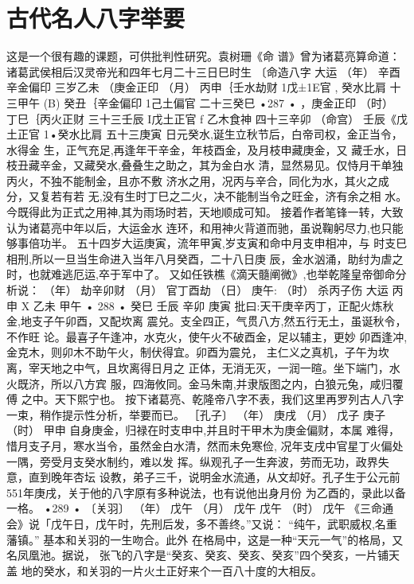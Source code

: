\section{古代名人八字举要}
这是一个很有趣的课题，可供批判性研究。袁树珊《命
谱》曾为诸葛亮算命道：
诸葛武侯相后汉灵帝光和四年七月二十三日巳时生
〔命造八字 大运
（年） 辛酉辛金偏印 三岁乙未
（庚金正印
（月） 丙申｛壬水劫财
1戊±1E官
,
癸水比肩
十三甲午
(B) 癸丑｛辛金偏印
1己土偏官
二十三癸巳
•287 •
，庚金正印
（时） 丁巳｛丙火正财 三十三壬辰 I戊土正官
f
乙木食神 四十三辛卯
（命宫） 壬辰《戊土正官
1•癸水比肩 五十三庚寅
日元癸水,诞生立秋节后，白帝司权，金正当令，水得金
生，正气充足,再逢年干辛金，年枝酉金，及月枝申藏庚金，又
藏壬水，日枝丑藏辛金，又藏癸水,叠叠生之助之，其为金白水
清，显然易见。仅恃月干单独丙火，不独不能制金，且亦不敷
济水之用，况丙与辛合，同化为水，其火之成分，又复若有若
无,没有生时丁巳之二火，决不能制当令之旺金，济有余之相
水。今既得此为正式之用神,其为雨场时若，天地顺成可知。
接着作者笔锋一转，大致认为诸葛亮中年以后，大运金水
连环，和用神火背道而驰，虽说鞠躬尽力,也只能够事倍功半。
五十四岁大运庚寅，流年甲寅,岁支寅和命中月支申相冲，与
时支巳相刑,所以一旦当生命进入当年八月癸酉，二十八日庚
辰，金水汹涌，助纣为虐之时，也就难逃厄运,卒于军中了。
又如任铁樵《滴天髓阐微》,也举乾隆皇帝御命分析说：
（年） 劫辛卯财
（月） 官丁酉劫
（日） 庚午:
（时） 杀丙子伤
大运 丙申 X
乙未
甲午
• 288 •
癸巳
壬辰
辛卯
庚寅
批曰:天干庚辛丙丁，正配火炼秋金,地支子午卯酉，又配坎离
震兑。支全四正，气贯八方,然五行无土，虽诞秋令，不作旺
论。最喜子午逢冲，水克火，使午火不破酉金，足以辅主，更妙
卯酉逢冲,金克木，则卯木不助午火，制伏得宜。卯酉为震兑，
主仁义之真机，子午为坎离，宰天地之中气，且坎离得日月之
正体，无消无灭，一润一暄。坐下端门，水火既济，所以八方宾
服，四海攸同。金马朱南,并隶版图之内，白狼元兔，咸归覆傅
之中。天下熙宁也。
按下诸葛亮、乾隆帝八字不表，我们这里再罗列古人八字
一束，稍作提示性分析，举要而已。
［孔子〕
（年） 庚戌
（月） 戊子
庚子
（时） 甲申
自身庚金，归禄在时支申中,并且时干甲木为庚金偏财，本属
难得，惜月支子月，寒水当令，虽然金白水清，然而未免寒俭,
况年支戌中官星丁火偏处一隅，旁受月支癸水制约，难以发
挥。纵观孔子一生奔波，劳而无功，政界失意，直到晚年杏坛
设教，弟子三千，说明金水流通，从文却好。孔子生于公元前
551年庚戌，关于他的八字原有多种说法，也有说他出身月份
为乙酉的，录此以备一格。
•289 •
〔关羽〕
（年） 戊午
（月） 戊午
戊午
（时） 戊午
《三命通会》说「戊午日，戊午时，先刑后发，多不善终。”又说：
“纯午，武职威权,名重藩镇。” 基本和关羽的一生吻合。此外
在格局中，这是一种“天元一气”的格局，又名凤凰池。据说，
张飞的八字是“癸亥、癸亥、癸亥、癸亥”四个癸亥，一片铺天盖
地的癸水，和关羽的一片火土正好来个一百八十度的大相反。
